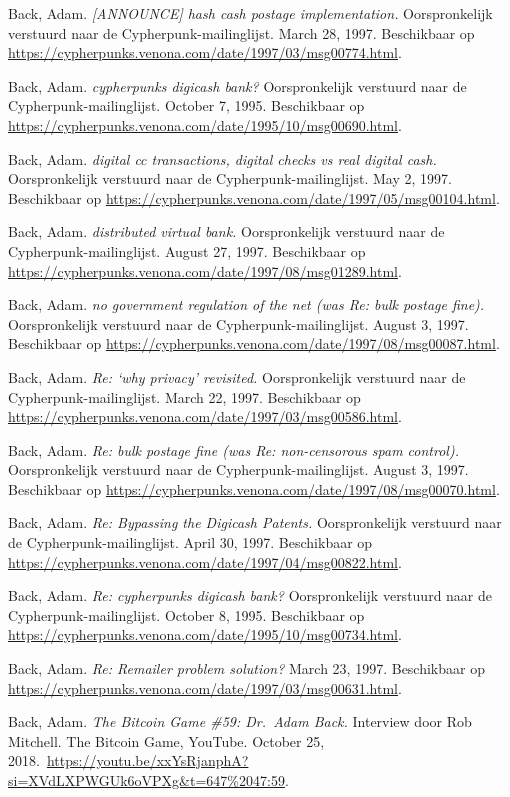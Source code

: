 \documentclass[
  a5paper,
  smalldemyvopaper,11pt,twoside,onecolumn,openright,extrafontsizes,
hidelinks]{memoir}
\begin{document}
Back, Adam. \emph{{[}ANNOUNCE{]} hash cash postage implementation.}
Oorspronkelijk verstuurd naar de Cypherpunk-mailinglijst. March 28,
1997. Beschikbaar op
\url{https://cypherpunks.venona.com/date/1997/03/msg00774.html}.

Back, Adam. \emph{cypherpunks digicash bank?} Oorspronkelijk verstuurd
naar de Cypherpunk-mailinglijst. October 7, 1995. Beschikbaar op
\url{https://cypherpunks.venona.com/date/1995/10/msg00690.html}.

Back, Adam. \emph{digital cc transactions, digital checks vs real
digital cash.} Oorspronkelijk verstuurd naar de Cypherpunk-mailinglijst.
May 2, 1997. Beschikbaar op
\url{https://cypherpunks.venona.com/date/1997/05/msg00104.html}.

Back, Adam. \emph{distributed virtual bank.} Oorspronkelijk verstuurd
naar de Cypherpunk-mailinglijst. August 27, 1997. Beschikbaar op
\url{https://cypherpunks.venona.com/date/1997/08/msg01289.html}.

Back, Adam. \emph{no government regulation of the net (was Re: bulk
postage fine).} Oorspronkelijk verstuurd naar de
Cypherpunk-mailinglijst. August 3, 1997. Beschikbaar op
\url{https://cypherpunks.venona.com/date/1997/08/msg00087.html}.

Back, Adam. \emph{Re: `why privacy' revisited.} Oorspronkelijk verstuurd
naar de Cypherpunk-mailinglijst. March 22, 1997. Beschikbaar op
\url{https://cypherpunks.venona.com/date/1997/03/msg00586.html}.

Back, Adam. \emph{Re: bulk postage fine (was Re: non-censorous spam
control).} Oorspronkelijk verstuurd naar de Cypherpunk-mailinglijst.
August 3, 1997. Beschikbaar op
\url{https://cypherpunks.venona.com/date/1997/08/msg00070.html}.

Back, Adam. \emph{Re: Bypassing the Digicash Patents.} Oorspronkelijk
verstuurd naar de Cypherpunk-mailinglijst. April 30, 1997. Beschikbaar
op \url{https://cypherpunks.venona.com/date/1997/04/msg00822.html}.

Back, Adam. \emph{Re: cypherpunks digicash bank?} Oorspronkelijk
verstuurd naar de Cypherpunk-mailinglijst. October 8, 1995. Beschikbaar
op \url{https://cypherpunks.venona.com/date/1995/10/msg00734.html}.

Back, Adam. \emph{Re: Remailer problem solution?} March 23, 1997.
Beschikbaar op
\url{https://cypherpunks.venona.com/date/1997/03/msg00631.html}.

Back, Adam. \emph{The Bitcoin Game \#59: Dr.~Adam Back.} Interview door
Rob Mitchell. The Bitcoin Game, YouTube. October 25,
2018.~\url{https://youtu.be/xxYsRjanphA?si=XVdLXPWGUk6oVPXg&t=647\%2047:59}.
\end{document}
